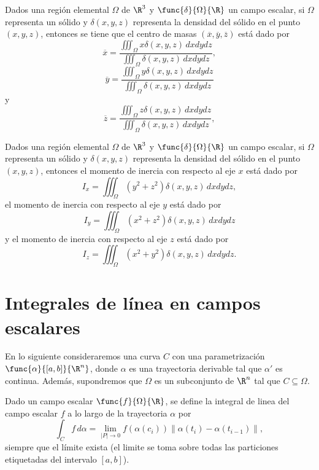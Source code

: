 \documentclass[a4,11pt]{aleph-notas}
\begin{document}
\begin{advertencia}
    Dados una región elemental $\Omega$ de $\R^3$ y $\func{\delta}{\Omega}{\R}$ un campo escalar, si $\Omega$ representa un sólido y $\delta(x,y,z)$ representa la densidad del sólido en el punto $(x,y,z)$, entonces se tiene que el centro de masas $(\overline{x},\overline{y},\overline{z})$ está dado por
    \[
        \overline{x}=
        \frac{\iiint_\Omega x\delta(x,y,z)\, dxdydz}
        {\iiint_\Omega \delta(x,y,z)\, dxdydz},
    \]
    \[
        \overline{y}=
        \frac{\iiint_\Omega y\delta(x,y,z)\, dxdydz}
        {\iiint_\Omega \delta(x,y,z)\, dxdydz}
    \]
    y
    \[
        \overline{z}=
        \frac{\iiint_\Omega z\delta(x,y,z)\, dxdydz}
        {\iiint_\Omega \delta(x,y,z)\, dxdydz},
    \]
\end{advertencia}
   
\begin{advertencia}
    Dados una región elemental $\Omega$ de $\R^3$ y $\func{\delta}{\Omega}{\R}$ un campo escalar, si $\Omega$ representa un sólido y $\delta(x,y,z)$ representa la densidad del sólido en el punto $(x,y,z)$, entonces el momento de inercia con respecto al eje $x$ está dado por
    \[
        I_x =
        \iiint_\Omega (y^2+z^2)\delta(x,y,z)\, dxdydz,
    \]
    el momento de inercia con respecto al eje $y$ está dado por
    \[
        I_y =
        \iiint_\Omega (x^2+z^2)\delta(x,y,z)\, dxdydz
    \]
    y el momento de inercia con respecto al eje $z$ está dado por
    \[
        I_z =
        \iiint_\Omega (x^2+y^2)\delta(x,y,z)\, dxdydz.
    \]
\end{advertencia}

\section{Integrales de línea en campos escalares}


En lo siguiente consideraremos una curva $C$ con una parametrización $\func{\alpha}{[a,b]}{\R^n}$, donde $\alpha$ es una trayectoria derivable tal que $\alpha'$ es continua. Además, supondremos que $\Omega$ es un subconjunto de $\R^n$ tal que $C\subseteq \Omega$.

\begin{defi}
    Dado un campo escalar $\func{f}{\Omega}{\R}$, se define la integral de linea del campo escalar $f$ a lo largo de la trayectoria $\alpha$ por
    \[
        \int_C f\, d\alpha 
        = \lim_{|P|\to 0} f(\alpha(c_i)) \| \alpha(t_i)-\alpha(t_{i-1}) \|,
    \]
    siempre que el límite exista (el limite se toma sobre todas las particiones etiquetadas del intervalo $[a,b]$).
\end{defi}
\end{document}

